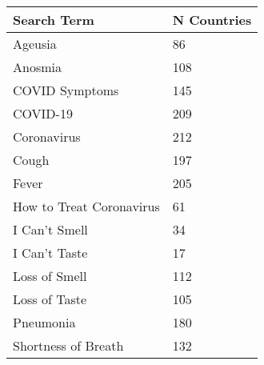 \begin{tabular}{ll} \hline Search Term & N Countries \\ 
\hline Ageusia  &  86  \\ 
Anosmia  &  108  \\ 
COVID Symptoms  &  145  \\ 
COVID-19  &  209  \\ 
Coronavirus  &  212  \\ 
Cough  &  197  \\ 
Fever  &  205  \\ 
How to Treat Coronavirus  &  61  \\ 
I Can't Smell  &  34  \\ 
I Can't Taste  &  17  \\ 
Loss of Smell  &  112  \\ 
Loss of Taste  &  105  \\ 
Pneumonia  &  180  \\ 
Shortness of Breath  &  132  \\ 
\hline \end{tabular} 